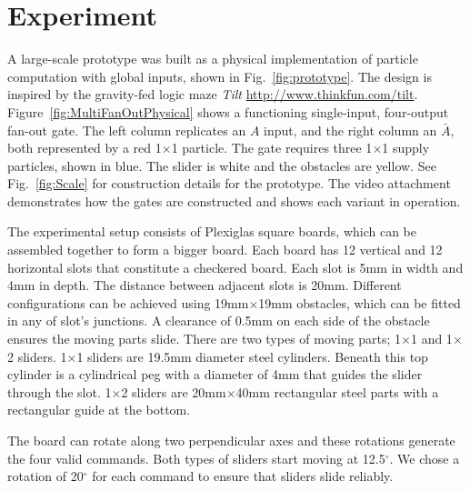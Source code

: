 \documentclass[letterpaper, 10 pt, conference]{ieeeconf}
\begin{document}
\section{Experiment}\label{sec:Experiment}
A large-scale prototype was built as a physical implementation of particle computation with global inputs, shown in Fig.~\ref{fig:prototype}.  The design is inspired by the gravity-fed logic maze \emph{Tilt\texttrademark}
\url{http://www.thinkfun.com/tilt}. Figure~\ref{fig:MultiFanOutPhysical} shows a functioning single-input, four-output {\sc fan-out} gate.  The left column replicates an $A$ input, and the right column an $\bar{A}$, both represented by a red 1$\times$1 particle.  The gate requires three  1$\times$1 supply particles, shown in blue.  The slider is white and the obstacles are yellow.  See Fig.~\ref{fig:Scale} for construction details for the prototype. The video attachment demonstrates how the gates are constructed and shows each variant in operation.

The experimental setup consists of Plexiglas square boards, which can be assembled together to form a bigger board. Each board has 12 vertical and 12 horizontal slots that constitute a checkered board. Each slot is 5mm in width and 4mm in depth.  The distance between adjacent slots is 20mm. Different configurations can be achieved using 19mm$\times$19mm obstacles, which can be fitted in any of slot's junctions. A clearance of 0.5mm on each side of the obstacle ensures the moving parts slide.  There are two types of moving parts; 1$\times$1 and 1$\times$2 sliders. 1$\times$1 sliders are 19.5mm diameter steel cylinders.  Beneath this top cylinder is a cylindrical peg with a diameter of 4mm that guides the slider through the slot. 1$\times$2 sliders are 20mm$\times$40mm rectangular steel parts with a rectangular guide at the bottom.

The board can rotate along two perpendicular axes and these rotations generate the four valid commands. Both types of sliders start moving at 12.5$^\circ$. We chose a rotation of 20$^\circ$ for each command to ensure that sliders  slide reliably.
\end{document}
